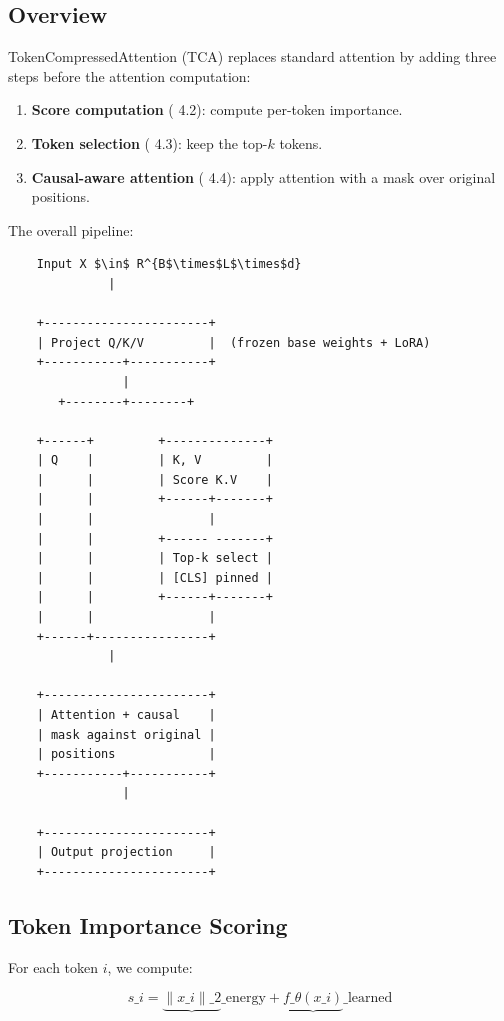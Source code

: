 \subsection{Overview}

TokenCompressedAttention (TCA) replaces standard attention by adding three 
steps before the attention computation:

\begin{enumerate}
\item \textbf{Score computation} ( 4.2): compute per-token importance.
\item \textbf{Token selection} ( 4.3): keep the top-$k$ tokens.
\item \textbf{Causal-aware attention} ( 4.4): apply attention with a mask over
  original positions.

\end{enumerate}
The overall pipeline:

\begin{lstlisting}
    Input X $\in$ R^{B$\times$L$\times$d}
              |
               
    +-----------------------+
    | Project Q/K/V         |  (frozen base weights + LoRA)
    +-----------+-----------+
                |
       +--------+--------+
                          
    +------+         +--------------+
    | Q    |         | K, V         |
    |      |         | Score K.V    |
    |      |         +------+-------+
    |      |                |
    |      |         +------ -------+
    |      |         | Top-k select |
    |      |         | [CLS] pinned |
    |      |         +------+-------+
    |      |                |
    +------+----------------+
              |
               
    +-----------------------+
    | Attention + causal    |
    | mask against original |
    | positions             |
    +-----------+-----------+
                |
                 
    +-----------------------+
    | Output projection     |
    +-----------------------+
\end{lstlisting}

\subsection{Token Importance Scoring}

For each token $i$, we compute:

\[
s\_i = \underbrace{\|x\_i\|\_2}\_{\text{energy}} + \underbrace{f\_\theta(x\_i)}\_{\text{learned}}
\tag{4.1}
\]

